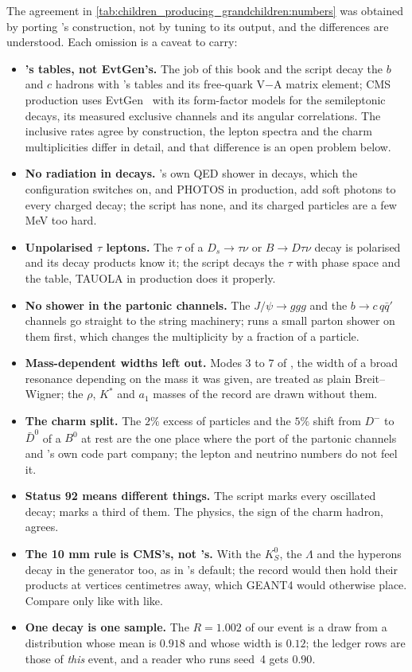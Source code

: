 The agreement in \cref{tab:children_producing_grandchildren:numbers} was
obtained by porting \PYTHIA's construction, not by tuning to its output,
and the differences are understood. Each omission is a caveat to carry:
\begin{itemize}
  \item \textbf{\PYTHIA's tables, not EvtGen's.} The \CMSSW job of this
    book and the script decay the $b$ and $c$ hadrons with \PYTHIA's
    tables and its free-quark V$-$A matrix element; CMS production uses
    EvtGen~\cite{Lange:2001uf,Abudinen:2024wpc} with its form-factor
    models for the semileptonic decays, its measured exclusive channels
    and its angular correlations. The inclusive rates agree by
    construction, the lepton spectra and the charm multiplicities differ
    in detail, and that difference is an open problem below.
  \item \textbf{No radiation in decays.} \PYTHIA's own QED shower in
    decays, which the \CMSSW configuration switches on, and PHOTOS in
    production, add soft photons to every charged decay; the script has
    none, and its charged particles are a few MeV too hard.
  \item \textbf{Unpolarised $\tau$ leptons.} The $\tau$ of a $D_s\to\tau\nu$
    or $B\to D\tau\nu$ decay is polarised and its decay products know it;
    the script decays the $\tau$ with phase space and the table, TAUOLA in
    production does it properly.
  \item \textbf{No shower in the partonic channels.} The $J/\psi\to ggg$
    and the $b\to c\,q\bar q'$ channels go straight to the string
    machinery; \PYTHIA runs a small parton shower on them first, which
    changes the multiplicity by a fraction of a particle.
  \item \textbf{Mass-dependent widths left out.} Modes 3 to 7 of
    \PYTHIA, the width of a broad resonance depending on the mass it was
    given, are treated as plain Breit--Wigner; the $\rho$, $K^*$ and
    $a_1$ masses of the record are drawn without them.
  \item \textbf{The charm split.} The $2\%$ excess of particles and the
    $5\%$ shift from $D^-$ to $\bar D^0$ of a $B^0$ at rest are the one
    place where the port of the partonic channels and \PYTHIA's own code
    part company; the lepton and neutrino numbers do not feel it.
  \item \textbf{Status 92 means different things.} The script marks every
    oscillated decay; \PYTHIA marks a third of them. The physics, the
    sign of the charm hadron, agrees.
  \item \textbf{The 10 mm rule is CMS's, not \PYTHIA's.} With
     the $K_S^0$, the $\Lambda$ and the hyperons
    decay in the generator too, as in \PYTHIA's default; the record would
    then hold their products at vertices centimetres away, which GEANT4
    would otherwise place. Compare only like with like.
  \item \textbf{One decay is one sample.} The $R=1.002$ of our event is a
    draw from a distribution whose mean is $0.918$ and whose width is
    $0.12$; the ledger rows are those of \emph{this} event, and a reader
    who runs seed~4 gets $0.90$.
\end{itemize}

